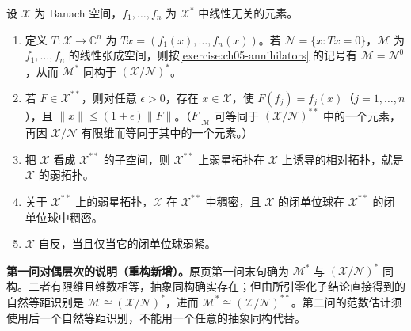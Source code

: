 \documentclass[../../main.tex]{subfiles}
\begin{document}
\begin{exercise}\label{exercise:ch05-goldstine-reflexive-compactness}
设 $\mathcal X$ 为 Banach 空间，$f_1,\ldots,f_n$ 为 $\mathcal X^*$ 中线性无关的元素。
\begin{enumerate}
\item\label{item:ch05-finite-evaluation-annihilator} 定义 $T:\mathcal X\to\mathbb C^n$ 为 $Tx=(f_1(x),\ldots,f_n(x))$。若 $\mathcal N=\{x:Tx=0\}$，$\mathcal M$ 为 $f_1,\ldots,f_n$ 的线性张成空间，则按\cref{exercise:ch05-annihilators} 的记号有 $\mathcal M=\mathcal N^0$，从而 $\mathcal M^*$ 同构于 $(\mathcal X/\mathcal N)^*$。
\item\label{item:ch05-finite-evaluation-interpolation} 若 $F\in\mathcal X^{**}$，则对任意 $\epsilon>0$，存在 $x\in\mathcal X$，使 $F(f_j)=f_j(x)$（$j=1,\ldots,n$），且 $\|x\|\le(1+\epsilon)\|F\|$。（$F|_{\mathcal M}$ 可等同于 $(\mathcal X/\mathcal N)^{**}$ 中的一个元素，再因 $\mathcal X/\mathcal N$ 有限维而等同于其中的一个元素。）
\item\label{item:ch05-embedded-weak-topology} 把 $\mathcal X$ 看成 $\mathcal X^{**}$ 的子空间，则 $\mathcal X^{**}$ 上弱星拓扑在 $\mathcal X$ 上诱导的相对拓扑，就是 $\mathcal X$ 的弱拓扑。
\item\label{item:ch05-goldstine-density} 关于 $\mathcal X^{**}$ 上的弱星拓扑，$\mathcal X$ 在 $\mathcal X^{**}$ 中稠密，且 $\mathcal X$ 的闭单位球在 $\mathcal X^{**}$ 的闭单位球中稠密。
\item\label{item:ch05-reflexive-weak-compact-ball} $\mathcal X$ 自反，当且仅当它的闭单位球弱紧。
\end{enumerate}
\end{exercise}
\begin{remark}
\textbf{第一问对偶层次的说明（重构新增）。}原页第一问末句确为 $\mathcal M^*$ 与 $(\mathcal X/\mathcal N)^*$ 同构。二者有限维且维数相等，抽象同构确实存在；但由所引零化子结论直接得到的自然等距识别是 $\mathcal M\cong(\mathcal X/\mathcal N)^*$，进而 $\mathcal M^*\cong(\mathcal X/\mathcal N)^{**}$。第二问的范数估计须使用后一个自然等距识别，不能用一个任意的抽象同构代替。
\end{remark}
\end{document}
